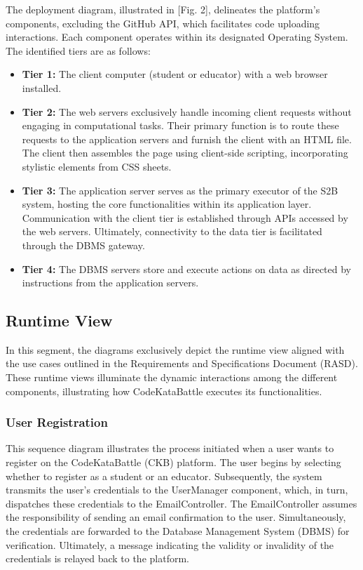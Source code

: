 \documentclass[12pt,oneside,a4paper]{article}
\begin{document}
\begin{flushleft}
The deployment diagram, illustrated in [Fig. 2], delineates the platform's components, excluding the GitHub API, which facilitates code uploading interactions. Each component operates within its designated Operating System. The identified tiers are as follows:    
\end{flushleft}

\begin{itemize}
    \item \textbf{Tier 1:} The client computer (student or educator) with a web browser installed.
    \item \textbf{Tier 2:} The web servers exclusively handle incoming client requests without engaging in computational tasks. Their primary function is to route these requests to the application servers and furnish the client with an HTML file. The client then assembles the page using client-side scripting, incorporating stylistic elements from CSS sheets.
    \item \textbf{Tier 3:} The application server serves as the primary executor of the S2B system, hosting the core functionalities within its application layer. Communication with the client tier is established through APIs accessed by the web servers. Ultimately, connectivity to the data tier is facilitated through the DBMS gateway.
    \item \textbf{{Tier 4:}} The DBMS servers store and execute actions on data as directed by instructions from the application servers.
\end{itemize}

\subsection{Runtime View}
In this segment, the diagrams exclusively depict the runtime view aligned with the use cases outlined in the Requirements and Specifications Document (RASD). These runtime views illuminate the dynamic interactions among the different components, illustrating how CodeKataBattle executes its functionalities.

\clearpage

\subsubsection{User Registration}
This sequence diagram illustrates the process initiated when a user wants to register on the CodeKataBattle (CKB) platform. The user begins by selecting whether to register as a student or an educator. Subsequently, the system transmits the user's credentials to the UserManager component, which, in turn, dispatches these credentials to the EmailController. The EmailController assumes the responsibility of sending an email confirmation to the user. Simultaneously, the credentials are forwarded to the Database Management System (DBMS) for verification. Ultimately, a message indicating the validity or invalidity of the credentials is relayed back to the platform.
\end{document}
